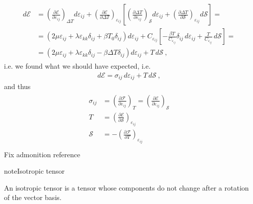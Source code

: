 \documentclass[letterpaper,10pt,english]{jupyterBook}
\begin{document}
\begin{equation*}
\begin{split}\begin{aligned}
  d \mathcal{E} 
  & = \left( \frac{\partial \mathcal{E}}{\partial \varepsilon_{ij}} \right)_{\Delta T} d \varepsilon_{ij} + \left( \frac{\partial \mathcal{E}}{\partial \Delta T} \right)_{\varepsilon_{ij}} \left[ \left( \frac{\partial \Delta T}{\partial \varepsilon_{ij}} \right)_{\mathcal{S}} d \varepsilon_{ij} + \left( \frac{\partial \Delta T}{\partial \mathcal{S}} \right)_{\varepsilon_{ij}} d \mathcal{S} \right] = \\
  & = \left( 2 \mu \varepsilon_{ij} + \lambda \varepsilon_{kk} \delta_{ij} + \beta T_0 \delta_{ij} \right) d \varepsilon_{ij} + 
   C_{\varepsilon_{ij}} \left[ -\frac{\beta T}{C_{\varepsilon_{ij}}} \delta_{ij} \, d \varepsilon_{ij} + \frac{T}{C_{\varepsilon_{ij}}} \, d \mathcal{S} \right] = \\
  & = \left( 2 \mu \varepsilon_{ij} + \lambda \varepsilon_{kk} \delta_{ij} - \beta \Delta T \delta_{ij} \right) d \varepsilon_{ij} + T \, d \mathcal{S} \ ,
\end{aligned}\end{split}
\end{equation*}
\sphinxAtStartPar
i.e. we found what we should have expected, i.e.
\begin{equation*}
\begin{split}d \mathcal{E} = \sigma_{ij} \, d \varepsilon_{ij} + T \, d\mathcal{S} \ , \end{split}
\end{equation*}
\sphinxAtStartPar
and thus
\begin{equation*}
\begin{split}\begin{aligned}
\sigma_{ij}
 & = \left( \frac{\partial \mathcal{F}}{\partial \varepsilon_{ij}} \right)_{T}
   = \left( \frac{\partial \mathcal{E}}{\partial \varepsilon_{ij}} \right)_{\mathcal{S}} \\
 T & = \left( \frac{\partial \mathcal{E}}{\partial \mathcal{S}} \right)_{\varepsilon_{ij}}\\
 \mathcal{S} & = - \left( \frac{\partial \mathcal{F}}{\partial T} \right)_{\varepsilon_{ij}}\\
\end{aligned}\end{split}
\end{equation*}
\sphinxAtStartPar
Fix admonition reference

\begin{sphinxadmonition}{note}{Isotropic tensor}

\sphinxAtStartPar
An isotropic tensor is a tensor whose components do not change after a rotation of the vector basis.  
\end{sphinxadmonition}
\end{document}
